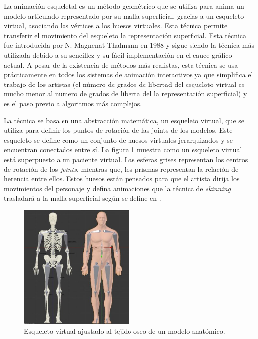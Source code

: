 La animación esqueletal es un método geométrico que se utiliza para anima un modelo articulado representado por su malla superficial, gracias a un esqueleto virtual, asociando los vértices a los huesos virtuales. Esta técnica permite transferir el movimiento del esqueleto la representación superficial. Esta técnica fue introducida por N. Magnenat Thalmann en 1988 \cite{thalmann88} y sigue siendo la técnica más utilizada debido a su sencillez y su fácil implementación en el cauce gráfico actual. A pesar de la existencia de métodos más realistas, esta técnica se usa prácticamente en todos los sistemas de animación interactivos ya que simplifica el trabajo de los artistas (el número de grados de libertad del esqueloto virtual es mucho menor al numero de grados de liberta del la representación superficial) y es el paso previo a algoritmos más complejos. %

La técnica se basa en una abstracción matemática, un esqueleto virtual, que se utiliza para definir los puntos de rotación de las \acl{joints} de los modelos. Este esqueleto se define como un conjunto de huesos virtuales jerarquizados y se encuentran conectados entre sí. La figura \ref{fig:virtualskeleton} muestra como un esqueleto virtual está superpuesto a un paciente virtual. Las esferas grises representan los centros de rotación de los \emph{\acs{joints}}, mientras que, los prismas representan la relación de herencia entre ellos. Estos huesos están pensados para que el artista dirija los movimientos del personaje y defina animaciones que la técnica de \emph{skinning} trasladará a la malla superficial según se define en \cite{thalmann88}. 

\begin{figure}[h]
   \centering
    \includegraphics[width=0.5\textwidth]{IMG/virtualskeleton.png}
    \caption{Esqueleto virtual ajustado al tejido oseo de un modelo anatómico.}
   \label{fig:virtualskeleton}
\end{figure}

